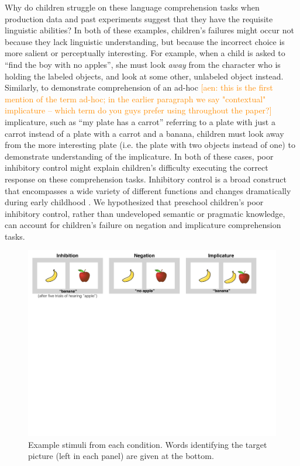 \documentclass[10pt,letterpaper]{article}
\newcommand{\aen}[1]{\textcolor{DarkOrange}{[aen: #1]}}
\begin{document}
Why do children struggle on these language comprehension tasks when production data and past experiments suggest that they have the requisite linguistic abilities? In both of these examples, children's failures might occur not because they lack linguistic understanding, but because the incorrect choice is more salient or perceptually interesting.  For example, when a child is asked to ``find the boy with no apples'', she must look \emph{away} from the character who is holding the labeled objects, and look at some other, unlabeled object instead.  Similarly, to demonstrate comprehension of an ad-hoc \aen{this is the first mention of the term ad-hoc; in the earlier paragraph we say "contextual" implicature -- which term do you guys prefer using throughout the paper?} implicature, such as ``my plate has a carrot'' referring to a plate with just a carrot instead of a plate with a carrot and a banana, children must look away from the more interesting plate (i.e. the plate with two objects instead of one) to demonstrate understanding of the implicature.  In both of these cases, poor inhibitory control might explain children's difficulty executing the correct response on these comprehension tasks.  Inhibitory control is a broad construct that encompasses a wide variety of different functions \cite{miyake2000} and changes dramatically during early childhood \cite{diamond1996,davidson2006}. We hypothesized that preschool children's poor inhibitory control, rather than undeveloped semantic or pragmatic knowledge, can account for children's failure on negation and implicature comprehension tasks.

\begin{figure}[!th]
\begin{centering}
\includegraphics[width=\textwidth]{figures/stimuli.pdf}
\caption{\label{fig:stimuli} Example stimuli from each condition. Words identifying the target picture (left in each panel) are given at the bottom.}
\end{centering}
\end{figure}
\end{document}
